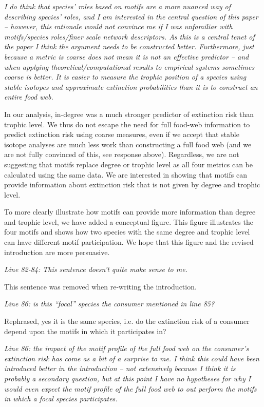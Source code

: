 \documentclass[12pt]{article}
\newcommand{\us}{\rm \setlength{\leftskip}{0.3cm} \setlength{\rightskip}{0.3cm}}
\newcommand{\them}{\it \setlength{\leftskip}{0cm} \setlength{\rightskip}{0cm}}
\begin{document}
        
        \them
        I do think that species' roles based on motifs are a more nuanced way of describing species' roles, and I am interested in the central question of this paper – however, this rationale would not convince me if I was unfamiliar with motifs/species roles/finer scale network descriptors.  As this is a central tenet of the paper I think the argument needs to be constructed better. Furthermore, just because a metric is coarse does not mean it is not an effective predictor – and when applying theoretical/computational results to empirical systems sometimes coarse is better. It is easier to measure the trophic position of a species using stable isotopes and approximate extinction probabilities than it is to construct an entire food web.
        
        \us In our analysis, in-degree was a much stronger predictor of extinction risk than trophic level. We thus do not escape the need for full food-web information to predict extinction risk using coarse measures, even if we accept that stable isotope analyses are much less work than constructing a full food web (and we are not fully convinced of this, see response above). 
        Regardless, we are not suggesting that motifs replace degree or trophic level as all four metrics can be calculated using the same data. We are interested in showing that motifs can provide information about extinction risk that is not given by degree and trophic level.
        
        
        To more clearly illustrate how motifs can provide more information than degree and trophic level, we have added a conceptual figure. This figure illustrates the four motifs and shows how two species with the same degree and trophic level can have different motif participation. We hope that this figure and the revised introduction are more persuasive.
        
        
        \them
        Line 82-84: This sentence doesn't quite make sense to me.
        
        \us
        This sentence was removed when re-writing the introduction.
        
        \them
        Line 86: is this ``focal'' species the consumer mentioned in line 85?
        
        \us
        Rephrased, yes it is the same species, i.e. do the extinction risk of a consumer depend upon the motifs in which it participates in?
        
        \them
        Line 86: the impact of the motif profile of the full food web on the consumer's extinction risk has come as a bit of a surprise to me. I think this could have been introduced better in the introduction – not extensively because I think it is probably a secondary question, but at this point I have no hypotheses for why I would even expect the motif profile of the full food web to out perform the motifs in which a focal species participates.
        
\end{document}
